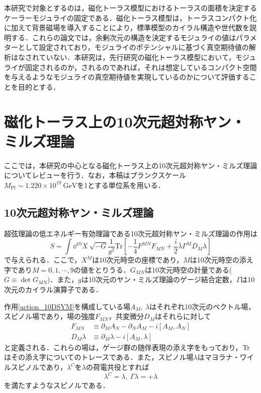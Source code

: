 \documentclass[a4paper,uplatex,dvipdfmx,10pt]{jsarticle}
\theoremstyle{definition}
\begin{document}
本研究で対象とするのは，磁化トーラス模型におけるトーラスの面積を決定するケーラーモジュライの固定である．磁化トーラス模型は，トーラスコンパクト化に加えて背景磁場を導入することにより，標準模型のカイラル構造や世代数を説明する\cite{Cremades_ComputingYukawa_2004a,Abe_SuperfieldDescription_2012,Abe_AhlerModuli_2017}．これらの論文では，余剰次元の構造を決定するモジュライの値はパラメターとして設定されており，モジュライのポテンシャルに基づく真空期待値の解析はなされていない．本研究は，先行研究の磁化トーラス模型において，モジュライが固定されるのか，されるのであれば，それは想定しているコンパクト空間を与えるようなモジュライの真空期待値を実現しているのかについて評価することを目的とする．


\section{磁化トーラス上の10次元超対称ヤン・ミルズ理論}

ここでは，本研究の中心となる磁化トーラス上の10次元超対称ヤン・ミルズ理論についてレビューを行う．なお，本稿はプランクスケール$M_{\text{Pl}}\sim 1.220\times 10^{19}\ \text{GeV}$を1とする単位系を用いる．


\subsection{10次元超対称ヤン・ミルズ理論}

超弦理論の低エネルギー有効理論である10次元超対称ヤン・ミルズ理論の作用は
\begin{equation}
   S
   =
   \int
   \dd^{10}X\ 
   \sqrt{-G}\frac{1}{g^2}
   \text{Tr}
   \left[  
      -
      \frac{1}{4}F^{MN}F_{MN}
      +
      \frac{i}{2}
      \bar{\lambda}\Gamma^{M}D_{M}\lambda
   \right]
   \label{action_10DSYM}
\end{equation}
で与えられる．ここで，$X^{M}$は10次元時空の座標であり，$M$は10次元時空の添え字であり$M=0,1,\cdots,9$の値をとりうる．$G_{MN}$は10次元時空の計量である($G\equiv\det G_{MN}$)．また，$g$は10次元のヤン・ミルズ理論のゲージ結合定数，$\Gamma$は10次元のカイラル演算子である．

作用\eqref{action_10DSYM}を構成している場$A_{M},\ \lambda$はそれぞれ10次元のベクトル場，スピノル場であり，場の強度$F_{MN}$，共変微分$D_{M}$はそれらに対して
\begin{align}
   F_{MN}
   &\equiv
   \partial_{M}A_{N}
   -
   \partial_{N}A_{M}
   -
   i[A_{M},A_{N}]
   \nonumber
   \\
   D_{M}\lambda
   &\equiv
   \partial_{M}\lambda
   -
   i[A_{M},\lambda]
   \nonumber
\end{align}
と定義される．これらの場は，ゲージ群の随伴表現の添え字をもっており，$\text{Tr\hspace{1pt}}$はその添え字についてのトレースである．また，スピノル場$\lambda$はマヨラナ・ワイルスピノルであり，$\lambda^{C}$を$\lambda$の荷電共役とすれば
\begin{equation}
   \lambda^{C}
   =
   \lambda
   ,\ 
   \Gamma\lambda
   =
   +\lambda
   \nonumber
\end{equation}
を満たすようなスピノルである．
\end{document}
